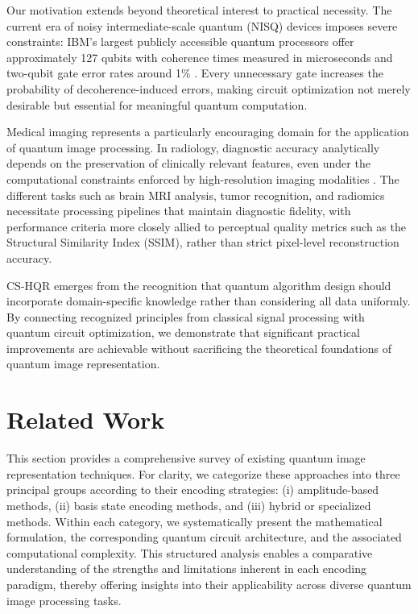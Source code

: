 \documentclass[11pt,a4paper]{article}
\begin{document}
Our motivation extends beyond theoretical interest to practical necessity. The current era of noisy intermediate-scale quantum (NISQ) devices imposes severe constraints: IBM's largest publicly accessible quantum processors offer approximately 127 qubits with coherence times measured in microseconds and two-qubit gate error rates around 1\% \cite{ref9}. Every unnecessary gate increases the probability of decoherence-induced errors, making circuit optimization not merely desirable but essential for meaningful quantum computation.

Medical imaging represents a particularly encouraging domain for the application of quantum image processing. In radiology, diagnostic accuracy analytically depends on the preservation of clinically relevant features, even under the computational constraints enforced by high-resolution imaging modalities \cite{ref10}. The different tasks such as brain MRI analysis, tumor recognition, and radiomics necessitate processing pipelines that maintain diagnostic fidelity, with performance criteria more closely allied to perceptual quality metrics such as the Structural Similarity Index (SSIM), rather than strict pixel-level reconstruction accuracy.

CS-HQR emerges from the recognition that quantum algorithm design should incorporate domain-specific knowledge rather than considering all data uniformly. By connecting recognized principles from classical signal processing with quantum circuit optimization, we demonstrate that significant practical improvements are achievable without sacrificing the theoretical foundations of quantum image representation.

\vspace{1em}
\section{Related Work}
\label{sec:related_work}
This section provides a comprehensive survey of existing quantum image representation techniques. For clarity, we categorize these approaches into three principal groups according to their encoding strategies: (i) amplitude-based methods, (ii) basis state encoding methods, and (iii) hybrid or specialized methods. Within each category, we systematically present the mathematical formulation, the corresponding quantum circuit architecture, and the associated computational complexity. This structured analysis enables a comparative understanding of the strengths and limitations inherent in each encoding paradigm, thereby offering insights into their applicability across diverse quantum image processing tasks.
\end{document}
